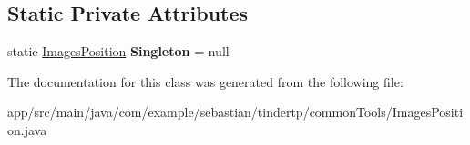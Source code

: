 \subsection*{Static Private Attributes}
\begin{DoxyCompactItemize}
\item 
static \hyperlink{classcom_1_1example_1_1sebastian_1_1tindertp_1_1commonTools_1_1ImagesPosition}{Images\+Position} {\bfseries Singleton} = null\hypertarget{classcom_1_1example_1_1sebastian_1_1tindertp_1_1commonTools_1_1ImagesPosition_a4df2ea3f24c65e445358b4afd2a844a5}{}\label{classcom_1_1example_1_1sebastian_1_1tindertp_1_1commonTools_1_1ImagesPosition_a4df2ea3f24c65e445358b4afd2a844a5}

\end{DoxyCompactItemize}


The documentation for this class was generated from the following file\+:\begin{DoxyCompactItemize}
\item 
app/src/main/java/com/example/sebastian/tindertp/common\+Tools/Images\+Position.\+java\end{DoxyCompactItemize}
